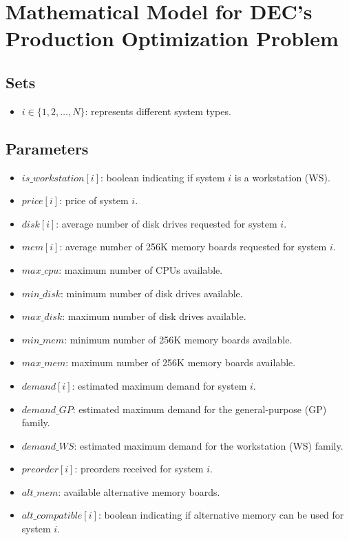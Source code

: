 \documentclass{article}
\begin{document}
\section*{Mathematical Model for DEC's Production Optimization Problem}

\subsection*{Sets}
\begin{itemize}
    \item \( i \in \{1, 2, \ldots, N\} \): represents different system types.
\end{itemize}

\subsection*{Parameters}
\begin{itemize}
    \item \( is\_workstation[i] \): boolean indicating if system \( i \) is a workstation (WS).
    \item \( price[i] \): price of system \( i \).
    \item \( disk[i] \): average number of disk drives requested for system \( i \).
    \item \( mem[i] \): average number of 256K memory boards requested for system \( i \).
    \item \( max\_cpu \): maximum number of CPUs available.
    \item \( min\_disk \): minimum number of disk drives available.
    \item \( max\_disk \): maximum number of disk drives available.
    \item \( min\_mem \): minimum number of 256K memory boards available.
    \item \( max\_mem \): maximum number of 256K memory boards available.
    \item \( demand[i] \): estimated maximum demand for system \( i \).
    \item \( demand\_GP \): estimated maximum demand for the general-purpose (GP) family.
    \item \( demand\_WS \): estimated maximum demand for the workstation (WS) family.
    \item \( preorder[i] \): preorders received for system \( i \).
    \item \( alt\_mem \): available alternative memory boards.
    \item \( alt\_compatible[i] \): boolean indicating if alternative memory can be used for system \( i \).
\end{itemize}
\end{document}
